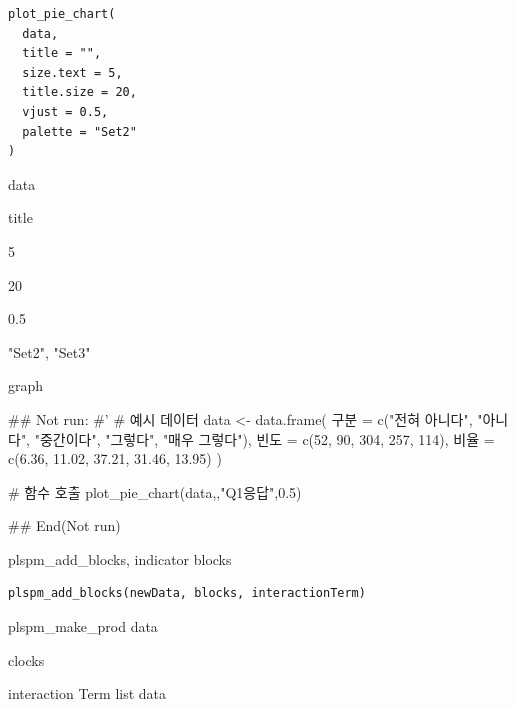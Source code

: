 \documentclass[a4paper]{book}
\begin{document}
%
\begin{Usage}
\begin{verbatim}
plot_pie_chart(
  data,
  title = "",
  size.text = 5,
  title.size = 20,
  vjust = 0.5,
  palette = "Set2"
)
\end{verbatim}
\end{Usage}
%
\begin{Arguments}
\begin{ldescription}
\item[\code{data}] data

\item[\code{title}] title

\item[\code{size.text}] 5

\item[\code{title.size}] 20

\item[\code{vjust}] 0.5

\item[\code{palette}] "Set2", "Set3"
\end{ldescription}
\end{Arguments}
%
\begin{Value}
graph
\end{Value}
%
\begin{Examples}
\begin{ExampleCode}

## Not run: 
#'
# 예시 데이터
data <- data.frame(
  구분 = c("전혀 아니다", "아니다", "중간이다", "그렇다", "매우 그렇다"),
  빈도 = c(52, 90, 304, 257, 114),
  비율 = c(6.36, 11.02, 37.21, 31.46, 13.95)
)

# 함수 호출
plot_pie_chart(data,,"Q1응답",0.5)

## End(Not run)

\end{ExampleCode}
\end{Examples}
%
\begin{Description}
plspm\_add\_blocks, indicator blocks
\end{Description}
%
\begin{Usage}
\begin{verbatim}
plspm_add_blocks(newData, blocks, interactionTerm)
\end{verbatim}
\end{Usage}
%
\begin{Arguments}
\begin{ldescription}
\item[\code{newData}] plspm\_make\_prod data

\item[\code{blocks}] clocks

\item[\code{interactionTerm}] interaction Term list data
\end{ldescription}
\end{Arguments}
\end{document}
